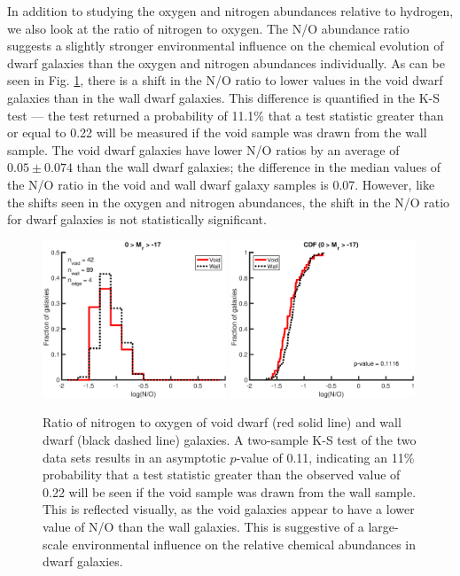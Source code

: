 In addition to studying the oxygen and nitrogen abundances relative to hydrogen, 
we also look at the ratio of nitrogen to oxygen.  The N/O abundance ratio 
suggests a slightly stronger environmental influence on the chemical evolution 
of dwarf galaxies than the oxygen and nitrogen abundances individually.  As can 
be seen in Fig. \ref{fig:NOratio}, there is a shift in the N/O ratio to lower 
values in the void dwarf galaxies than in the wall dwarf galaxies.  This 
difference is quantified in the K-S test --- the test returned a probability of 
11.1\% that a test statistic greater than or equal to 0.22 will be measured if 
the void sample was drawn from the wall sample.  The void dwarf galaxies have 
lower N/O ratios by an average of $0.05\pm 0.074$ than the wall dwarf galaxies; 
the difference in the median values of the N/O ratio in the void and wall dwarf 
galaxy samples is 0.07.  However, like the shifts seen in the oxygen and 
nitrogen abundances, the shift in the N/O ratio for dwarf galaxies is not 
statistically significant.

\begin{figure}
    \centering
    \includegraphics[width=0.49\textwidth]{Images/Paper2/1sig_dwarf_SF_t3_logNO_hist}
    \includegraphics[width=0.49\textwidth]{Images/Paper2/1sig_dwarf_SF_t3_logNO_CDF}
    \caption[N/O distribution of 135 dwarf galaxy sample]{Ratio of nitrogen to 
    oxygen of void dwarf (red solid line) and wall dwarf (black dashed line) 
    galaxies.  A two-sample K-S test of the two data sets results in an 
    asymptotic $p$-value of 0.11, indicating an 11\% probability that a test 
    statistic greater than the observed value of 0.22 will be seen if the void 
    sample was drawn from the wall sample.  This is reflected visually, as the 
    void galaxies appear to have a lower value of N/O than the wall galaxies.  
    This is suggestive of a large-scale environmental influence on the relative 
    chemical abundances in dwarf galaxies.}
    \label{fig:NOratio}
\end{figure}

